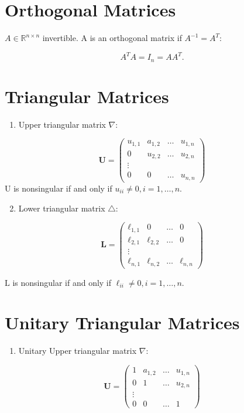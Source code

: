 \documentclass[11pt]{book}
\begin{document}
\section*{Orthogonal Matrices}
$A \in \mathbb{R}^{n \times n}$ invertible. A is an orthogonal matrix if $A^{-1}=A^{T}$:

$$
A^{T} A=I_{n}=A A^{T}.
$$

\section*{Triangular Matrices}
\begin{enumerate}
  \item Upper triangular matrix $\nabla$:
\end{enumerate}

$$
\mathbf{U}=\left(\begin{array}{cccc}
u_{1,1} & a_{1,2} & \ldots & u_{1, n} \\
0 & u_{2,2} & \ldots & u_{2, n} \\
\vdots & & & \\
0 & 0 & \ldots & u_{n, n}
\end{array}\right)
$$
$\mathrm{U}$ is nonsingular if and only if $u_{i i} \neq 0, i=1, \ldots, n.$

\begin{enumerate}
  \setcounter{enumi}{1}
  \item Lower triangular matrix $\triangle$:
\end{enumerate}

$$
\mathbf{L}=\left(\begin{array}{cccc}
\ell_{1,1} & 0 & \ldots & 0 \\
\ell_{2,1} & \ell_{2,2} & \ldots & 0 \\
\vdots & & & \\
\ell_{n, 1} & \ell_{n, 2} & \ldots & \ell_{n, n}
\end{array}\right)
$$

$\mathrm{L}$ is nonsingular if and only if $\ell_{i i} \neq 0, i=1, \ldots, n.$

\section*{Unitary Triangular Matrices}
\begin{enumerate}
  \item Unitary Upper triangular matrix $\nabla$:
\end{enumerate}

$$
\mathbf{U}=\left(\begin{array}{cccc}
1 & a_{1,2} & \ldots & u_{1, n} \\
0 & 1 & \ldots & u_{2, n} \\
\vdots & & & \\
0 & 0 & \ldots & 1
\end{array}\right)
$$
\end{document}
